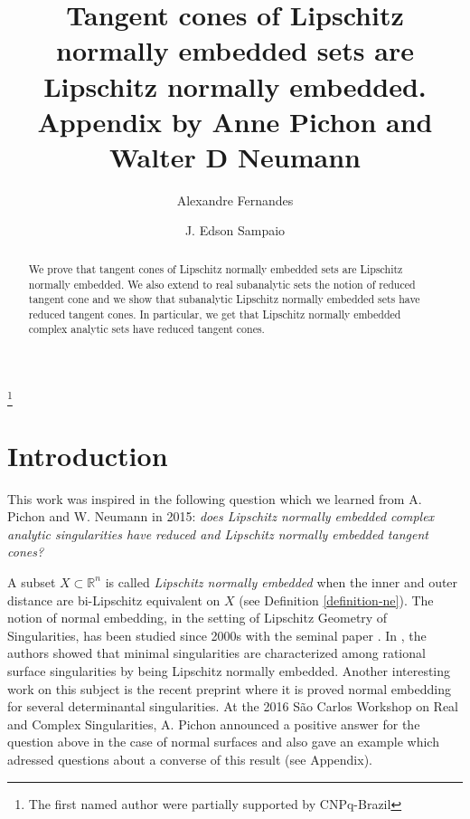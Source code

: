 \documentclass{amsart}
\newcommand{\R}{\mathbb{R}}
\begin{document}
\title[Tangent cones of Lip. normally embedded sets are Lip. normally embedded]
{Tangent cones of Lipschitz normally embedded sets are Lipschitz normally embedded. Appendix by Anne Pichon and Walter D Neumann}

\author{Alexandre Fernandes}
\author{J. Edson Sampaio}
\address{Alexandre ~Fernandes and J. Edson ~Sampaio -
Departamento de Matem\'atica, Universidade Federal do Cear\'a Av.
Humberto Monte, s/n Campus do Pici - Bloco 914, 60455-760
Fortaleza-CE, Brazil}




%
\thanks{The first named author were partially supported by CNPq-Brazil}

\begin{abstract}
We prove that tangent cones of Lipschitz normally embedded sets are Lipschitz normally embedded. We also extend to real subanalytic sets  the notion of reduced tangent cone  and  we show that subanalytic Lipschitz normally embedded sets have reduced tangent cones. In particular, we get that Lipschitz normally embedded complex analytic sets have reduced tangent cones.
\end{abstract}

\maketitle

\section{Introduction}

This work was inspired in the following question which we learned from A. Pichon and W. Neumann in 2015: {\it does Lipschitz normally embedded complex analytic singularities have reduced and Lipschitz normally embedded tangent cones?}

A subset $X\subset\R^n$ is called \emph{Lipschitz normally embedded} when the inner and outer distance are bi-Lipschitz equivalent on $X$ (see Definition \ref{definition-ne}).  The notion of normal embedding, in the setting of Lipschitz Geometry of Singularities, has been  studied since 2000s  with the seminal paper \cite{BirbrairM:2000}. In \cite{NeumannPP}, the authors  showed that minimal singularities are characterized among rational surface singularities by being Lipschitz normally embedded. Another interesting work on this subject is the recent preprint \cite{KernerPR:2017} where it is proved normal embedding for several determinantal singularities. At the 2016 S\~ao Carlos Workshop on Real and Complex Singularities, A. Pichon announced a positive answer for the question above in the case of normal surfaces and also gave an example which adressed questions about a converse of this result (see Appendix). 
\end{document}
